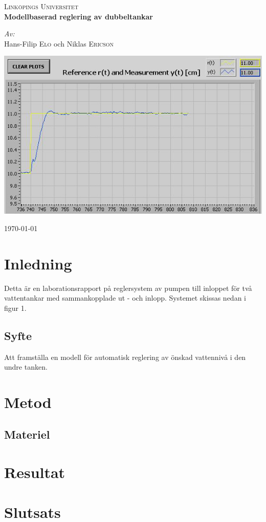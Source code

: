 \documentclass{article}
\begin{document}
\begin{titlepage}
\begin{center}


\textsc{\LARGE Link{\"o}pings Universitet}\\[1.5cm]


{ \huge \bfseries Modellbaserad reglering av dubbeltankar \\[0.4cm] }

\large
\emph{Av:}\\
Hans-Filip \textsc{Elo} och Niklas \textsc{Ericson}

\vfill

\includegraphics[scale=1, angle=0]{Test3_cut.jpg}

{\large \today}

\end{center}
\end{titlepage}


\section{Inledning}
Detta {\"a}r en laborationsrapport p{\aa} reglersystem av pumpen till inloppet för tv{\aa} vattentankar med sammankopplade ut - och inlopp. Systemet skissas nedan i figur 1. 

\subsection{Syfte}
Att framst{\"a}lla en modell för automatisk reglering av {\"o}nskad vattenniv{\aa} i den undre tanken. 

\section{Metod}


\subsection{Materiel}

\section{Resultat}

\section{Slutsats}
\end{document}
